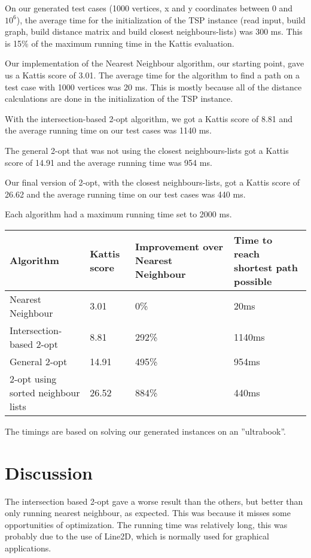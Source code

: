 \documentclass[article,11pt]{article}
\begin{document}
On our generated test cases (1000 vertices, x and y coordinates
between 0 and $10^6$), the average time for the initialization of the
TSP instance (read input, build graph, build distance matrix and build
closest neighbours-lists) was 300 ms. This is 15\% of the maximum
running time in the Kattis evaluation.

Our implementation of the Nearest Neighbour algorithm, our starting
point, gave us a Kattis score of 3.01. The average time for the
algorithm to find a path on a test case with 1000 vertices was 20
ms. This is mostly because all of the distance calculations are done
in the initialization of the TSP instance.

With the intersection-based 2-opt algorithm, we got a Kattis score of
8.81 and the average running time on our test cases was 1140 ms.

The general 2-opt that was not using the closest neighbours-lists got
a Kattis score of 14.91 and the average running time was 954 ms.

Our final version of 2-opt, with the closest neighbours-lists, got a
Kattis score of 26.62 and the average running time on our test cases
was 440 ms.

Each algorithm had a maximum running time set to 2000 ms.
\begin{center}
\begin{tabular}{|p{3cm}|p{2cm}|p{3cm}|p{3cm}|}
\hline
Algorithm&Kattis score&Improvement over Nearest Neighbour&Time to
reach shortest path possible\\\hline
Nearest Neighbour&3.01&0\%&20ms\\\hline
Intersection-based 2-opt&8.81&292\%&1140ms\\\hline
General 2-opt&14.91&495\%&954ms\\\hline
2-opt using sorted neighbour lists&26.52&884\%&440ms\\\hline
\end{tabular}
\end{center}
The timings are based on solving our generated instances on an
''ultrabook''.
\section{Discussion}
The intersection based 2-opt gave a worse result than the others, but
better than only running nearest neighbour, as expected. This was
because it misses some opportunities of optimization. The running time
was relatively long, this was probably due to the use of Line2D, which
is normally used for graphical applications.
\end{document}
